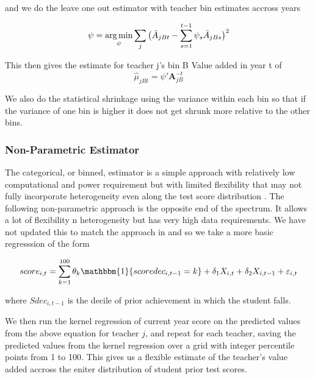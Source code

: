 \documentclass[12pt]{article}
\theoremstyle{definition}
\theoremstyle{definition}
\theoremstyle{definition}
\theoremstyle{definition}
\begin{document}
    and we do the leave one out estimator with teacher bin estimates accross years 

    \begin{equation}
        \psi = \operatorname*{arg\,min}_{\psi} \sum_j \big(  \bar{A}_{jBt} - \sum_{s = 1}^{t-1} \psi_s \bar{A}_{jBs} \big)^2
    \end{equation}

    This then gives the estimate for teacher j's  bin B Value added in year t of 
    \begin{equation}
        \hat{\mu}_{jBt} = \psi'\mathbf{A}_{jB}^{-t}
    \end{equation}

    We also do the statistical shrinkage using the variance within each bin so that if the variance of one bin is higher it does not get shrunk more relative to the other bins. 

    \subsubsection{Non-Parametric Estimator}
    The categorical, or binned, estimator is a simple approach with relatively low computational and power requirement but with limited flexibility that may not fully incorporate heterogeneity even along the test score distribution . The following non-parametric approach is the opposite end of the spectrum. It allows a lot of flexibility n heterogeneity but has very high data requirements. We have not updated this to match the approach in \citet{chetty2014measuring1} and so we take a more basic regresssion of the form
    
    \begin{align*}
        score_{i,t} = \sum_{k=1}^{100} \theta_k \mathbbm{1}\{scoredec_{i, t-1} = k\} + \delta_1 X_{i, t} + \delta_2 X_{i, t-1} + \varepsilon_{i, t}
    \end{align*}
        
    \noindent where $Sdec_{i, t-1}$ is the decile of prior achievement in which the student falls. 
    
      We then run the kernel regression of current year score on the predicted values from the above equation for teacher $j$, and repeat for each teacher, saving the predicted values from the kernel regression over a grid with integer percentile points from 1 to 100. This gives us a flexible estimate of the teacher's value added accross the eniter distribution of student prior test scores.
    
\end{document}

